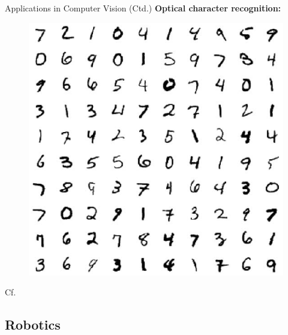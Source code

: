 \begin{frame}{Applications in Computer Vision (Ctd.)}{}
	\textbf{Optical character recognition:}
	\begin{figure}
		\includegraphics[scale=0.3]{01_intro_ml/02_img/digit_recognition}
	\end{figure}
	{\footnotesize Cf. \href{https://www.youtube.com/watch?v=yxuRnBEczUU}{}}
\end{frame}


\subsection{Robotics}

